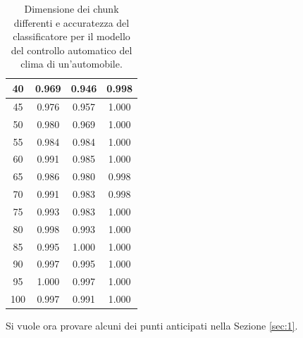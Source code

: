 \documentclass[Lau,binding=0.6cm]{sapthesis}
\begin{document}
\begin{table}
\begin{center}
\begin{tabular}{|c|c|c|c|}
            \hline
            40 & 0.969 & 0.946 & 0.998 \\
            \hline
            45 & 0.976 & 0.957 & 1.000 \\
            \hline
            50 & 0.980 & 0.969 & 1.000 \\
            \hline
            55 & 0.984 & 0.984 & 1.000 \\
            \hline
            60 & 0.991 & 0.985 & 1.000 \\
            \hline
            65 & 0.986 & 0.980 & 0.998 \\
            \hline
            70 & 0.991 & 0.983 & 0.998 \\
            \hline
            75 & 0.993 & 0.983 & 1.000 \\
            \hline
            80 & 0.998 & 0.993 & 1.000 \\
            \hline
            85 & 0.995 & 1.000 & 1.000 \\
            \hline
            90 & 0.997 & 0.995 & 1.000 \\
            \hline
            95 & 1.000 & 0.997 & 1.000 \\
            \hline
            100 & 0.997 & 0.991 & 1.000 \\
            \hline
        \end{tabular}
    \end{center}
    \caption{Dimensione dei chunk differenti e accuratezza del classificatore per il modello del controllo automatico del clima di un'automobile.}
    \label{tab:3}
\end{table}

Si vuole ora provare alcuni dei punti anticipati nella Sezione \ref{sec:1}.
\end{document}
